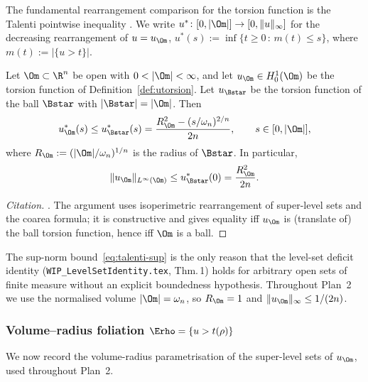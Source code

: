 The fundamental rearrangement comparison for the torsion function is
the Talenti pointwise inequality \cite{Talenti1976}. We write
$u^*\colon[0,|\Om|]\to[0,\|u\|_\infty]$ for the decreasing
rearrangement of $u=u_\Om$, $u^*(s):=\inf\{t\ge 0\,:\,m(t)\le s\}$,
where $m(t):=|\{u>t\}|$.

\begin{theorem}[Talenti, 1976]\label{thm:talenti}
Let $\Om\subset\R^n$ be open with $0<|\Om|<\infty$, and let
$u_\Om\in H^{1}_{0}(\Om)$ be the torsion function of
Definition~\ref{def:utorsion}. Let $u_{\Bstar}$ be the torsion
function of the ball $\Bstar$ with $|\Bstar|=|\Om|$. Then
\begin{equation}\label{eq:talenti}
   u^*_\Om(s)\le u^*_{\Bstar}(s)
   =\frac{R_\Om^2-(s/\omega_n)^{2/n}}{2n},
   \qquad s\in[0,|\Om|],
\end{equation}
where $R_\Om:=(|\Om|/\omega_n)^{1/n}$ is the radius of $\Bstar$. In
particular,
\begin{equation}\label{eq:talenti-sup}
   \|u_\Om\|_{L^\infty(\Om)}\le u^*_{\Bstar}(0)=\frac{R_\Om^2}{2n}.
\end{equation}
\end{theorem}

\begin{proof}[Citation]
\cite[Thm.~1]{Talenti1976}. The argument uses isoperimetric
rearrangement of super-level sets and the coarea formula; it is
constructive and gives equality iff $u_\Om$ is (translate of) the
ball torsion function, hence iff $\Om$ is a ball.
\end{proof}

\begin{remark}
\label{rem:talenti-Linf}
The sup-norm bound~\eqref{eq:talenti-sup} is the only reason that
the level-set deficit identity
(\texttt{WIP\_LevelSetIdentity.tex}, Thm.\,1) holds for arbitrary
open sets of finite measure without an explicit boundedness
hypothesis. Throughout Plan~2 we use the normalised volume
$|\Om|=\omega_n$, so $R_\Om=1$ and
$\|u_\Om\|_\infty\le 1/(2n)$.
\end{remark}

\subsubsection{Volume--radius foliation \texorpdfstring{$\Erho=\{u>t(\rho)\}$}{E\_rho=\{u>t(rho)\}}}
\label{ssec:foliation}

We now record the volume-radius parametrisation of the super-level
sets of $u_\Om$, used throughout Plan~2.

